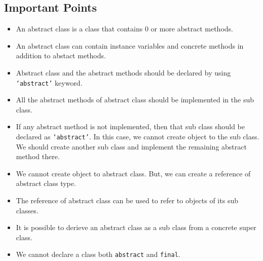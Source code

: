 \documentclass[11pt,a4paper]{article}
\begin{document}
\subsection*{Important Points}
\begin{itemize}
\item An abstract class is a class that contains 0 or more abstract methods.
\item An abstract class can contain instance variables and concrete methods in addition to abstact methods.
\item Abstract class and the abstract methods should be declared by using \texttt{`abstract'} keyword.
\item All the abstract methods of abstract class should be implemented in the sub class.
\item If any abstract method is not implemented, then that sub class should be declared as \texttt{`abstract'}. In this case, we cannot create object to the sub class. We should create another sub class and implement the remaining abstract method there.
\item We cannot create object to abstract class. But, we can create a reference of abstract class type.
\item The reference of abstract class can be used to refer to objects of its sub classes.
\item It is possible to derieve an abstract class as a sub class from a concrete super class.
\item We cannot declare a class both \lstinline!abstract! and \lstinline!final!.
\end{itemize}
\vfill{\ }
\end{document}
